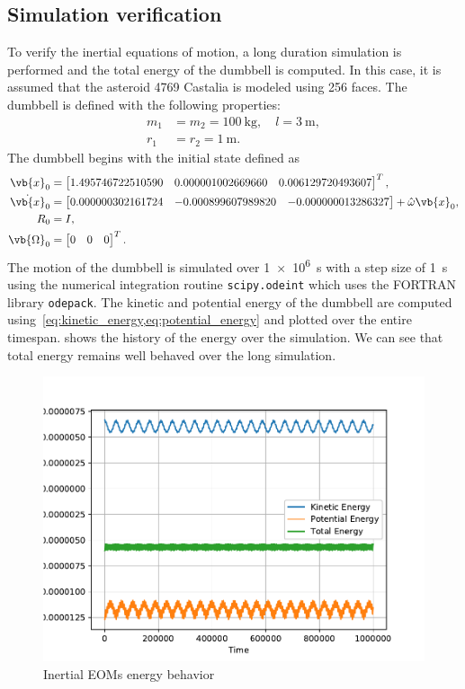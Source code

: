 \documentclass[11pt, reqno]{article}    %
\begin{document}
\subsection{Simulation verification}\label{ssec:inertial_eoms_sim}
To verify the inertial equations of motion, a long duration simulation is performed and the total energy of the dumbbell is computed.
In this case, it is assumed that the asteroid 4769 Castalia is modeled using \num{256} faces.
The dumbbell is defined with the following properties:
\begin{align*}
    m_1 &= m_2 = \SI{100}{\kilo\gram},  \quad l = \SI{3}{\meter} ,\\
    r_1 &= r_2 = \SI{1}{\meter}.
\end{align*} 
The dumbbell begins with the initial state defined as
\begin{align*}
    \vb{x}_0 &= \begin{bmatrix} 1.495746722510590 & 0.000001002669660 & 0.006129720493607\end{bmatrix}^T , \\
    \dot{\vb{x}}_0 &= \begin{bmatrix} 0.000000302161724 & -0.000899607989820 & -0.000000013286327\end{bmatrix} + \hat\omega \vb{x}_0 , \\
    R_0 & = I , \\
    \vb{\Omega}_0 &= \begin{bmatrix} 0 & 0 & 0\end{bmatrix}^T.
\end{align*}
The motion of the dumbbell is simulated over \SI{1e6}{\second} with a step size of \SI{1}{\second} using the numerical integration routine \texttt{scipy.odeint} which uses the FORTRAN library \texttt{odepack}.
The kinetic and potential energy of the dumbbell are computed using~\cref{eq:kinetic_energy,eq:potential_energy} and plotted over the entire timespan.
 shows the history of the energy over the simulation.
We can see that total energy remains well behaved over the long simulation.
\begin{figure}
    \centering
    \includegraphics[width=\textwidth]{figures/ast_dumbbell_inertial_energy.pdf}
    \caption{Inertial EOMs energy behavior}\label{fig:inertial_energy}
\end{figure}
\end{document}
